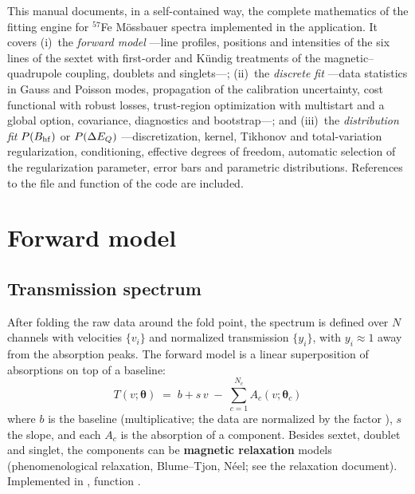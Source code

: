 \noindent
This manual documents, in a self-contained way, the complete mathematics of the
fitting engine for $^{57}$Fe Mössbauer spectra implemented in the application. It
covers (i)~the \emph{forward model} —line profiles, positions and intensities of the
six lines of the sextet with first-order and Kündig treatments of the
magnetic–quadrupole coupling, doublets and singlets—; (ii)~the \emph{discrete fit}
—data statistics in Gauss and Poisson modes, propagation of the calibration
uncertainty, cost functional with robust losses, trust-region optimization with
multistart and a global option, covariance, diagnostics and bootstrap—; and
(iii)~the \emph{distribution fit} $P(B_{\mathrm{hf}})$ or $P(\Delta E_{Q})$ —discretization, kernel,
Tikhonov and total-variation regularization, conditioning, effective degrees of
freedom, automatic selection of the regularization parameter, error bars and
parametric distributions. References to the file and function of the code are
included.



\bigskip

\section{Forward model}

\subsection{Transmission spectrum}\label{sec:fwd}

After folding the raw data around the fold point, the spectrum is defined over $N$
channels with velocities $\{v_i\}$ and normalized transmission $\{y_i\}$, with
$y_i\approx 1$ away from the absorption peaks. The forward model is a linear
superposition of absorptions on top of a baseline:
\begin{equation}
  \boxed{\;
  T(v;\bm\theta) \;=\; b + s\,v \;-\; \sum_{c=1}^{N_c} A_c(v;\bm\theta_c)
  \;}
  \label{eq:Tmodel}
\end{equation}
where $b$ is the baseline (multiplicative; the data are normalized by the factor
), $s$ the slope, and each $A_c$ is the absorption of a
component. Besides sextet, doublet and singlet, the components can be
\textbf{magnetic relaxation} models (phenomenological relaxation, Blume--Tjon,
Néel; see the relaxation document). Implemented in ,
function .

